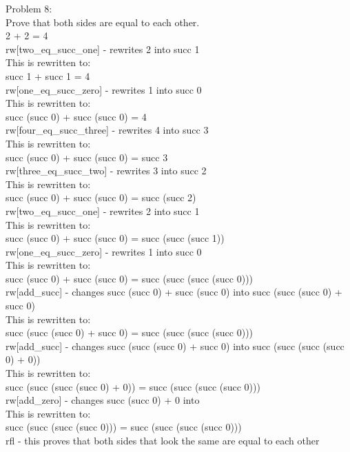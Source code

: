 \documentclass{article}
\theoremstyle{theorem}
\theoremstyle{definition}
\theoremstyle{remark}
\begin{document}
Problem 8: \\
Prove that both sides are equal to each other. \\
2 + 2 = 4 \\
rw[two\_eq\_succ\_one] - rewrites 2 into succ 1 \\
This is rewritten to: \\ 
succ 1 + succ 1 = 4 \\
rw[one\_eq\_succ\_zero] - rewrites 1 into succ 0 \\
This is rewritten to: \\ 
succ (succ 0) + succ (succ 0) = 4 \\
rw[four\_eq\_succ\_three] - rewrites 4 into succ 3 \\
This is rewritten to: \\ 
succ (succ 0) + succ (succ 0) = succ 3 \\
rw[three\_eq\_succ\_two] - rewrites 3 into succ 2 \\
This is rewritten to: \\ 
succ (succ 0) + succ (succ 0) = succ (succ 2) \\
rw[two\_eq\_succ\_one] - rewrites 2 into succ 1 \\
This is rewritten to: \\ 
succ (succ 0) + succ (succ 0) = succ (succ (succ 1)) \\
rw[one\_eq\_succ\_zero] - rewrites 1 into succ 0 \\
This is rewritten to: \\ 
succ (succ 0) + succ (succ 0) = succ (succ (succ (succ 0))) \\
rw[add\_succ] - changes succ (succ 0) + succ (succ 0) into succ (succ (succ 0) + succ 0) \\
This is rewritten to: \\ 
succ (succ (succ 0) + succ 0) = succ (succ (succ (succ 0))) \\
rw[add\_succ] - changes succ (succ (succ 0) + succ 0) into succ (succ (succ (succ 0) + 0)) \\
This is rewritten to: \\ 
succ (succ (succ (succ 0) + 0)) = succ (succ (succ (succ 0))) \\
rw[add\_zero] - changes succ (succ 0) + 0 into \\
This is rewritten to: \\ 
succ (succ (succ (succ 0))) = succ (succ (succ (succ 0))) \\ 
rfl - this proves that both sides that look the same are equal to each other \\
\end{document}
